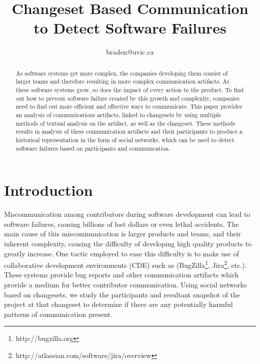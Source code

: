 \documentclass[conference]{IEEEtran}
\begin{document}
\title{Changeset Based Communication to Detect Software Failures}

\author{
braden@uvic.ca}

\maketitle

\begin{abstract}
As software systems get more complex, the companies developing them consist of larger teams and therefore resulting in more complex communication artifacts.  As these software systems grow, so does the impact of every action to the product.  To find out how to prevent software failure created by this growth and complexity, companies need to find out more efficient and effective ways to communicate.  This paper provides an analysis of communications artifacts, linked to changesets by using multiple methods of textual analysis on the artifact, as well as the changeset.  These methods results in analysis of these communication artifacts and their participants to produce a historical representation in the form of social networks, which can be used to detect software failures based on participants and communication.
\end{abstract}

\section{Introduction}

Miscommunication among contributors during software development can lead to software failures, causing billions of lost dollars or even lethal accidents. \cite{Wolf:2009:PBF:1555001.1555017} The main cause of this miscommunication is larger products and teams, and their inherent complexity, causing the difficulty of developing high quality products to greatly increase.  One tactic employed to ease this difficulty is to make use of collaborative development environments (CDE) such as (BugZilla\footnote{http://bugzilla.org}, Jira\footnote{http://atlassian.com/software/jira/overview}, etc.)\cite{CDE}.  These systems provide bug reports and other communication artifacts which provide a medium for better contributor communication.  Using social networks based on changesets, we study the participants and resultant snapshot of the project at that changeset to determine if there are any potentially harmful patterns of communication present.  
\end{document}
